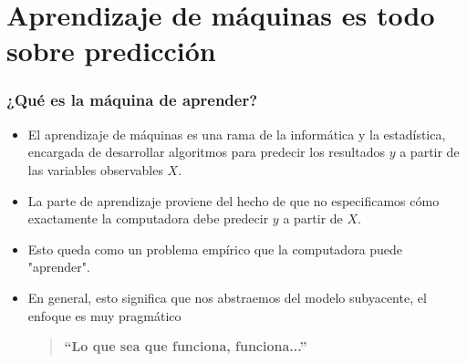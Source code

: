 \documentclass[
  shownotes,
  xcolor={svgnames},
  hyperref={colorlinks,citecolor=DarkBlue,linkcolor=DarkRed,urlcolor=DarkBlue}
  , aspectratio=169]{beamer}
\begin{document}
\section{Aprendizaje de máquinas es todo sobre predicción}
 \begin{frame}[noframenumbering]
\tableofcontents[currentsubsection]

\end{frame}
\begin{frame}
\frametitle{¿Qué es la máquina de aprender?}

\begin{itemize}
  \item El aprendizaje de máquinas es una rama de la informática y la estadística, encargada de desarrollar algoritmos para predecir los resultados $y$ a partir de las variables observables $X$.
  \medskip
  \item La parte de aprendizaje proviene del hecho de que no especificamos cómo exactamente la computadora debe predecir $y$ a partir de $X$.
  \medskip
   \item Esto queda como un problema empírico que la computadora puede "aprender".
   \medskip
  \item En general, esto significa que nos abstraemos del modelo subyacente, el enfoque es muy pragmático
  
  \bigskip
  \bigskip

  \pause
  \begin{quote}
  \centering
  \bf ``Lo que sea que funciona, funciona...''
  \end{quote}
\end{itemize}
\end{frame}
\end{document}
